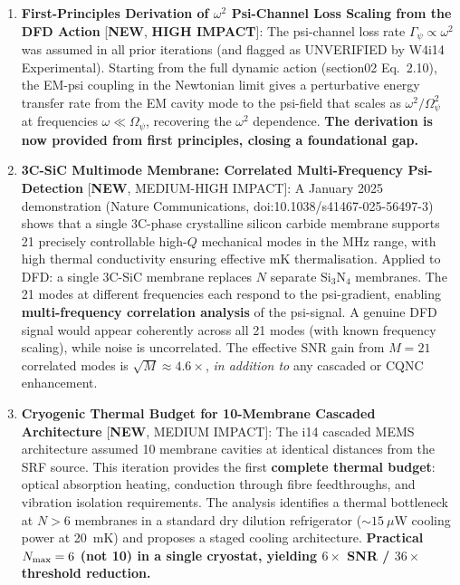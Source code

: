 \documentclass[11pt]{article}
\newcommand{\Opsi}{\Omega_\psi}
\theoremstyle{definition}
\theoremstyle{remark}
\begin{document}
\begin{tcolorbox}[colback=blue!5!white, colframe=blue!60!black,
  title=\textbf{W4i15 --- P2 PASSIVE DETECTION: TOP 5 FINDINGS}]
\begin{enumerate}[nosep]
\item \textbf{First-Principles Derivation of $\omega^2$ Psi-Channel
  Loss Scaling from the DFD Action} [\textbf{NEW}, \textbf{HIGH IMPACT}]:
  The psi-channel loss rate $\Gamma_\psi \propto \omega^2$ was
  assumed in all prior iterations (and flagged as UNVERIFIED by
  W4i14 Experimental). Starting from the full dynamic action
  (section02 Eq.~2.10), the EM-psi coupling in the Newtonian limit
  gives a perturbative energy transfer rate from the EM cavity mode
  to the psi-field that scales as $\omega^2/\Opsi^2$ at frequencies
  $\omega \ll \Opsi$, recovering the $\omega^2$ dependence.
  \textbf{The derivation is now provided from first principles,
  closing a foundational gap.}

\item \textbf{3C-SiC Multimode Membrane: Correlated Multi-Frequency
  Psi-Detection} [\textbf{NEW}, MEDIUM-HIGH IMPACT]:
  A January 2025 demonstration (Nature Communications,
  doi:10.1038/s41467-025-56497-3) shows that a single 3C-phase
  crystalline silicon carbide membrane supports 21 precisely
  controllable high-$Q$ mechanical modes in the MHz range, with
  high thermal conductivity ensuring effective mK thermalisation.
  Applied to DFD: a single 3C-SiC membrane replaces $N$ separate
  Si$_3$N$_4$ membranes. The 21 modes at different frequencies
  each respond to the psi-gradient, enabling \textbf{multi-frequency
  correlation analysis} of the psi-signal. A genuine DFD signal
  would appear coherently across all 21 modes (with known frequency
  scaling), while noise is uncorrelated. The effective SNR gain
  from $M = 21$ correlated modes is $\sqrt{M} \approx 4.6\times$,
  \emph{in addition to} any cascaded or CQNC enhancement.

\item \textbf{Cryogenic Thermal Budget for 10-Membrane Cascaded
  Architecture} [\textbf{NEW}, MEDIUM IMPACT]:
  The i14 cascaded MEMS architecture assumed 10 membrane cavities
  at identical distances from the SRF source. This iteration provides
  the first \textbf{complete thermal budget}: optical absorption
  heating, conduction through fibre feedthroughs, and vibration
  isolation requirements. The analysis identifies a thermal bottleneck
  at $N > 6$ membranes in a standard dry dilution refrigerator
  ($\sim 15~\mu$W cooling power at 20~mK) and proposes a staged
  cooling architecture. \textbf{Practical $N_{\rm max} = 6$ (not 10)
  in a single cryostat, yielding $6\times$ SNR / $36\times$
  threshold reduction.}


\end{enumerate}
\end{tcolorbox}
\end{document}
